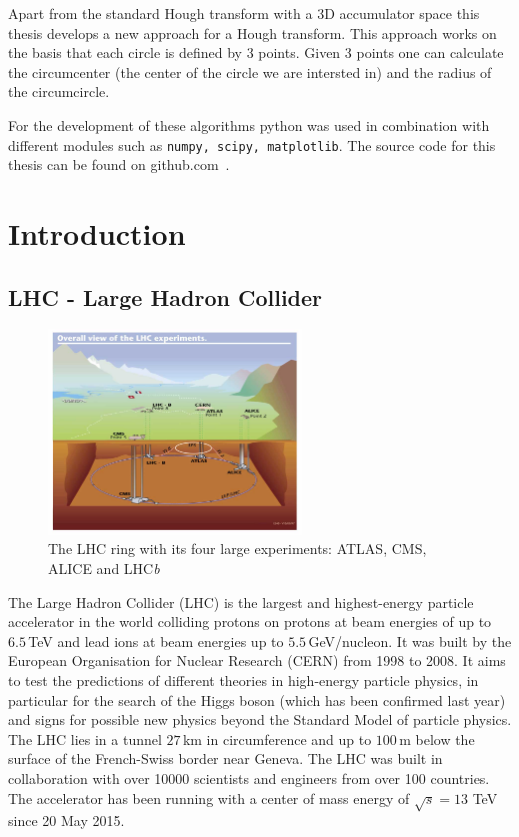 \documentclass[11pt]{scrreprt}
\begin{document}
Apart from the standard Hough transform with a 3D accumulator space this thesis develops a new approach for a Hough transform. 
This approach works on the basis that each circle is defined by 3 points. Given 3 points one can calculate the circumcenter 
(the center of the circle we are intersted in) and the radius of the circumcircle.

For the development of these algorithms python was used in combination with different modules such as \texttt{numpy, scipy, matplotlib}. The source code for this thesis can be found on github.com~\cite{Gloor2016}.

\tableofcontents
\listoftables
\listoffigures	
\listofcodesnippets

\chapter{Introduction}
\section{LHC - Large Hadron Collider} %
\label{sec:lhc_large_hadron_collider}
\begin{figure}[htb]
  \centering
  \includegraphics[width=0.6\textwidth]{pics/lhc}
  \caption{The LHC ring with its four large experiments: ATLAS, CMS, ALICE and LHC\textit{b}}
  \label{fig:lhc}
\end{figure}

The Large Hadron Collider (LHC) is the largest and highest-energy particle accelerator in the world colliding protons on protons
at beam energies of up to $6.5$\,TeV and lead ions at beam energies up to $5.5$\,GeV/nucleon. It was built by the European 
Organisation for Nuclear Research (CERN) from 1998 to 2008. It aims to test the predictions of different theories in high-energy particle 
physics, in particular for the search of the Higgs boson (which has been confirmed last year) and signs for possible new physics beyond 
the Standard Model of particle physics. The LHC lies in a tunnel $27$\,km in circumference and up to $100$\,m below the surface of the 
French-Swiss border near Geneva. The LHC was built in collaboration with over 10000 scientists and engineers from over 100 countries. 
The accelerator has been running with a center of mass energy of $\sqrt{s} = 13$ TeV since 20 May 2015.
\end{document}
